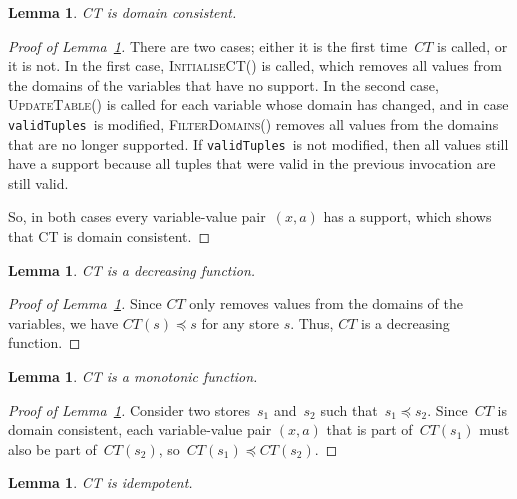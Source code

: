 \documentclass[a4paper,11pt]{article}
\newtheorem{lemma}[theorem]{Lemma}
\newcommand{\Lemmaref}[1]{Lemma~\ref{#1}}
\newcommand{\CurrTable}{\texttt{validTuples}}
\def\UpdateTable{\textsc{UpdateTable}}
\def\FilterDomains{\textsc{FilterDomains}}
\def\InitialiseCT{\textsc{InitialiseCT}}
\numberwithin{equation}{section}
\begin{document}
\begin{lemma}\label{lemma:domain-consistent}
  CT is domain consistent.
\end{lemma}

\begin{proof}[Proof of \Lemmaref{lemma:domain-consistent}]
  There are two cases; either it is the first time~$CT$ is called, or it
  is not.
  In the first case, \InitialiseCT() is called, which removes all values
  from the domains of the variables that have no support.
  In the second case, \UpdateTable() is called for each variable whose
  domain has changed, and in case \CurrTable~is modified, \FilterDomains()
  removes all values from the domains that are no longer supported.
  If \CurrTable~is not modified, then all values still have a support because
  all tuples that were valid in the previous invocation are still valid.
  
  So, in both cases every variable-value pair~$(x,a)$ has a support,
  which shows that CT is domain consistent.
\end{proof}

\begin{lemma} \label{lemma:decreasing}
  CT is a decreasing function.
\end{lemma}

\begin{proof}[Proof of \Lemmaref{lemma:decreasing}]
  Since $CT$ only removes values from
  the domains of the variables, we have $CT(s) \preceq s$ for any store $s$.
  Thus, $CT$ is a decreasing function.
\end{proof}

\begin{lemma}\label{lemma:monotonic}
  CT is a monotonic function.
\end{lemma}

\begin{proof}[Proof of \Lemmaref{lemma:monotonic}]
  Consider two stores~$s_1$ and~$s_2$ such that~$s_1 \preceq s_2$.
  Since~$CT$ is domain consistent, each variable-value pair $(x,a)$
  that is part of~$CT(s_1)$ must also be part of~$CT(s_2)$,
  so~$CT(s_1) \preceq CT(s_2)$.
\end{proof}


\begin{lemma}\label{lemma:idempotent}
  CT is idempotent.
\end{lemma}
\end{document}
